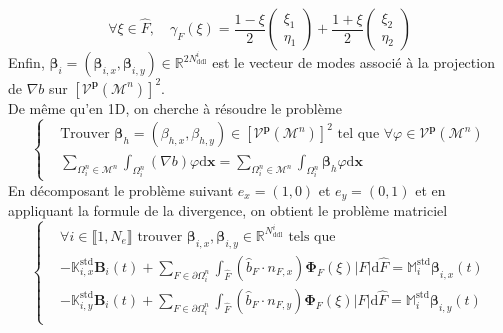 \documentclass[11pt, a4paper, oneside]{report}
\begin{document}
\begin{equation}
    \forall \xi \in \widehat{F}, \quad \gamma_F(\xi) = \frac{1-\xi}{2} \begin{pmatrix} \xi_1 \\ \eta_1 \end{pmatrix} + \frac{1+\xi}{2} \begin{pmatrix} \xi_2 \\ \eta_2 \end{pmatrix}
\end{equation}
Enfin, $\bm{\beta}_i = (\bm{\beta}_{i, x}, \bm{\beta}_{i, y}) \in \mathbb{R}^{2N_\text{ddl}^i}$ est le vecteur de modes associé à la projection de $\nabla b$ sur $\left[ \mathcal{V}^\mathbf{p}(\mathcal{M}^n) \right]^2$. \\
De même qu'en 1D, on cherche à résoudre le problème
\begin{equation}
    \left \{
    \begin{aligned}
        &\text{Trouver } \bm{\beta}_h = (\beta_{h, x}, \beta_{h, y}) \in \left[ \mathcal{V}^\mathbf{p}(\mathcal{M}^n) \right]^2 \text{ tel que } \forall \varphi \in \mathcal{V}^\mathbf{p}(\mathcal{M}^n) \\
        &\sum_{\Omega_i^n \in \mathcal{M}^n} \int_{\Omega_i^n} (\nabla b) \varphi \text{d}\bm{x} = \sum_{\Omega_i^n \in \mathcal{M}^n} \int_{\Omega_i^n} \bm{\beta}_h \varphi \text{d}\bm{x}
    \end{aligned}
    \right .
\end{equation}
En décomposant le problème suivant $e_x = (1, 0)$ et $e_y = (0, 1)$ et en appliquant la formule de la divergence, on obtient le problème matriciel
\begin{equation} \label{eq:Beta_Exner_2D}
    \left \{
    \begin{aligned}
        & \forall i \in \llbracket 1, N_e \rrbracket \text{ trouver } \bm{\beta}_{i, x}, \bm{\beta}_{i, y} \in \mathbb{R}^{N_\text{ddl}^i} \text{ tels que} \\
        & - \mathbb{K}_{i, x}^\text{std} \bm{B}_i(t) + \sum_{F \in \partial \Omega_i^n} \int_{\widehat{F}} \left( \widehat{b}_F \cdot n_{F, x} \right) \bm{\Phi}_F(\xi) \lvert F \rvert \text{d}\widehat{F} = \mathbb{M}_i^\text{std} \bm{\beta}_{i, x}(t) \\
        & - \mathbb{K}_{i, y}^\text{std} \bm{B}_i(t) + \sum_{F \in \partial \Omega_i^n} \int_{\widehat{F}} \left( \widehat{b}_F \cdot n_{F, y} \right) \bm{\Phi}_F(\xi) \lvert F \rvert \text{d}\widehat{F} = \mathbb{M}_i^\text{std} \bm{\beta}_{i, y}(t) \\
    \end{aligned}
    \right .
\end{equation}
\end{document}
